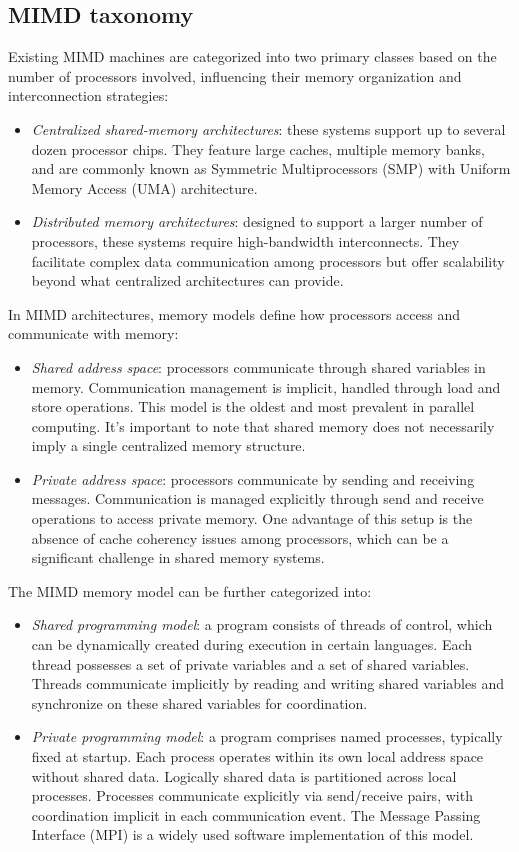 \subsection{MIMD taxonomy}
Existing MIMD machines are categorized into two primary classes based on the number of processors involved, influencing their memory organization and interconnection strategies:
\begin{itemize}
    \item \textit{Centralized shared-memory architectures}: these systems support up to several dozen processor chips. 
        They feature large caches, multiple memory banks, and are commonly known as Symmetric Multiprocessors (SMP) with Uniform Memory Access (UMA) architecture.
    \item \textit{Distributed memory architectures}: designed to support a larger number of processors, these systems require high-bandwidth interconnects. 
        They facilitate complex data communication among processors but offer scalability beyond what centralized architectures can provide.
\end{itemize}
In MIMD architectures, memory models define how processors access and communicate with memory:
\begin{itemize}
    \item \textit{Shared address space}: processors communicate through shared variables in memory. 
        Communication management is implicit, handled through load and store operations. 
        This model is the oldest and most prevalent in parallel computing.
        It's important to note that shared memory does not necessarily imply a single centralized memory structure.
    \item \textit{Private address space}: processors communicate by sending and receiving messages. 
        Communication is managed explicitly through send and receive operations to access private memory.
        One advantage of this setup is the absence of cache coherency issues among processors, which can be a significant challenge in shared memory systems.
\end{itemize}
The MIMD memory model can be further categorized into: 
\begin{itemize}
    \item \textit{Shared programming model}: a program consists of threads of control, which can be dynamically created during execution in certain languages.
        Each thread possesses a set of private variables and a set of shared variables. 
        Threads communicate implicitly by reading and writing shared variables and synchronize on these shared variables for coordination.
    \item \textit{Private programming model}: a program comprises named processes, typically fixed at startup. 
        Each process operates within its own local address space without shared data. Logically shared data is partitioned across local processes. 
        Processes communicate explicitly via send/receive pairs, with coordination implicit in each communication event. 
        The Message Passing Interface (MPI) is a widely used software implementation of this model.
\end{itemize}
